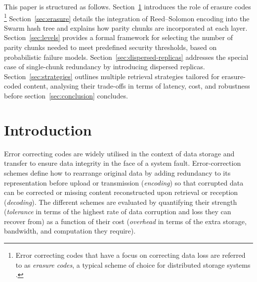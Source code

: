 \documentclass[manuscript,screen,review]{acmart}
\begin{document}

\maketitle


This paper is structured as follows.
Section~\ref{sec:error-correcting-codes} introduces the role of erasure codes%
%
\footnote{Error correcting codes that have a focus on correcting data loss are referred to as \emph{erasure codes}, a typical scheme of choice for distributed storage systems \citep{balaji2018erasure}.}
%
Section~\ref{sec:erasure} details the integration of Reed–Solomon encoding into the Swarm hash tree and explains how parity chunks are incorporated at each layer.
Section~\ref{sec:levels} provides a formal framework for selecting the number of parity chunks needed to meet predefined security thresholds, based on probabilistic failure models.
Section~\ref{sec:dispersed-replicas} addresses the special case of single-chunk redundancy by introducing dispersed replicas.
Section~\ref{sec:strategies} outlines multiple retrieval strategies tailored for erasure-coded content, analysing their trade-offs in terms of latency, cost, and robustness before section~\ref{sec:conclusion} concludes.

\section{Introduction} \label{sec:error-correcting-codes}

Error correcting codes are widely utilised in the context of data storage and transfer to ensure data integrity in the face of a system fault. Error-correction schemes define how to rearrange original data by adding redundancy to its representation before upload or transmission (\emph{encoding}) so that corrupted data can be corrected or missing content reconstructed upon retrieval or reception (\emph{decoding}). The different schemes are evaluated by quantifying their strength (\emph{tolerance} in terms of the highest rate of data corruption and loss they can recover from) as a function of their cost (\emph{overhead} in terms of the extra storage, bandwidth, and computation they require).
\end{document}
